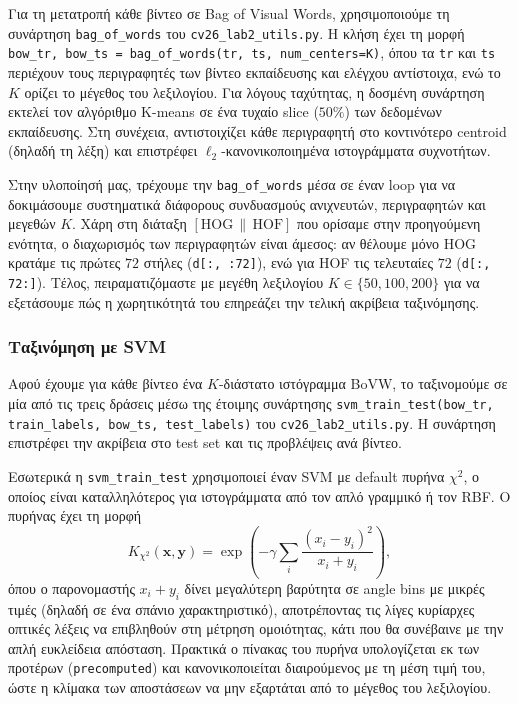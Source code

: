 \documentclass[12pt, a4paper]{article}
\begin{document}
Για τη μετατροπή κάθε βίντεο σε Bag of Visual Words, χρησιμοποιούμε τη συνάρτηση \texttt{bag\_of\_words} του \texttt{cv26\_lab2\_utils.py}. Η κλήση έχει τη μορφή \texttt{bow\_tr, bow\_ts = bag\_of\_words(tr, ts, num\_centers=K)}, όπου τα \texttt{tr} και \texttt{ts} περιέχουν τους περιγραφητές των βίντεο εκπαίδευσης και ελέγχου αντίστοιχα, ενώ το $K$ ορίζει το μέγεθος του λεξιλογίου. Για λόγους ταχύτητας, η δοσμένη συνάρτηση εκτελεί τον αλγόριθμο K-means σε ένα τυχαίο slice ($50\%$) των δεδομένων εκπαίδευσης. Στη συνέχεια, αντιστοιχίζει κάθε περιγραφητή στο κοντινότερο centroid (δηλαδή τη λέξη) και επιστρέφει $\ell_2$-κανονικοποιημένα ιστογράμματα συχνοτήτων.

Στην υλοποίησή μας, τρέχουμε την \texttt{bag\_of\_words} μέσα σε έναν loop για να δοκιμάσουμε συστηματικά διάφορους συνδυασμούς ανιχνευτών, περιγραφητών και μεγεθών $K$. Χάρη στη διάταξη $[\text{HOG}\,\|\,\text{HOF}]$ που ορίσαμε στην προηγούμενη ενότητα, ο διαχωρισμός των περιγραφητών είναι άμεσος: αν θέλουμε μόνο HOG κρατάμε τις πρώτες $72$ στήλες (\texttt{d[:, :72]}), ενώ για HOF τις τελευταίες $72$ (\texttt{d[:, 72:]}). Τέλος, πειραματιζόμαστε με μεγέθη λεξιλογίου $K \in \{50, 100, 200\}$ για να εξετάσουμε πώς η χωρητικότητά του επηρεάζει την τελική ακρίβεια ταξινόμησης.

\subsubsection{Ταξινόμηση με SVM}

Αφού έχουμε για κάθε βίντεο ένα $K$-διάστατο ιστόγραμμα BoVW, το
ταξινομούμε σε μία από τις τρεις δράσεις μέσω της έτοιμης συνάρτησης
\texttt{svm\_train\_test(bow\_tr, train\_labels, bow\_ts, test\_labels)}
του \texttt{cv26\_lab2\_utils.py}. Η συνάρτηση επιστρέφει την ακρίβεια
στο test set και τις προβλέψεις ανά βίντεο.

Εσωτερικά η \texttt{svm\_train\_test} χρησιμοποιεί έναν SVM με default πυρήνα
$\chi^2$, ο οποίος είναι καταλληλότερος για ιστογράμματα από τον απλό
γραμμικό ή τον RBF. Ο πυρήνας έχει τη μορφή
\begin{equation}
    K_{\chi^2}(\mathbf{x}, \mathbf{y}) =
    \exp\!\left(-\gamma \sum_i \frac{(x_i - y_i)^2}{x_i + y_i}\right),
\end{equation}
όπου ο παρονομαστής $x_i + y_i$ δίνει μεγαλύτερη βαρύτητα σε angle bins με
μικρές τιμές (δηλαδή σε ένα σπάνιο χαρακτηριστικό), αποτρέποντας τις λίγες κυρίαρχες οπτικές λέξεις να
επιβληθούν στη μέτρηση ομοιότητας, κάτι που θα συνέβαινε με την απλή
ευκλείδεια απόσταση. Πρακτικά ο πίνακας του πυρήνα υπολογίζεται εκ των
προτέρων (\texttt{precomputed}) και κανονικοποιείται διαιρούμενος με τη
μέση τιμή του, ώστε η κλίμακα των αποστάσεων να μην εξαρτάται από το
μέγεθος του λεξιλογίου.
\end{document}
